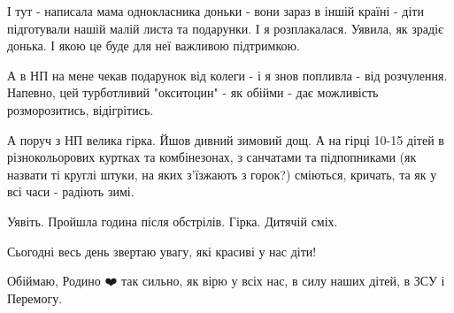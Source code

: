 І тут - написала мама однокласника доньки - вони зараз в іншій країні - діти
підготували нашій малій листа та подарунки. І я розплакалася. Уявила, як зрадіє
донька. І якою це буде для неї важливою підтримкою. 

А в НП на мене чекав подарунок від колеги - і я знов попливла - від розчулення.
Напевно, цей турботливий "окситоцин" - як обійми - дає можливість
розморозитись, відігрітись. 

А поруч з НП велика гірка. Йшов дивний зимовий дощ. А на гірці  10-15 дітей в
різнокольорових куртках та комбінезонах, з санчатами та підпопниками (як
назвати ті круглі штуки, на яких з'їзжають з горок?) сміються, кричать, та як у
всі часи - радіють зимі. 

Уявіть. Пройшла година після обстрілів. Гірка. Дитячій сміх. 

Сьогодні весь день звертаю увагу, які красиві у нас діти! 

Обіймаю, Родино ❤️ так сильно, як вірю у всіх нас, в силу наших дітей,  в ЗСУ і
Перемогу.


